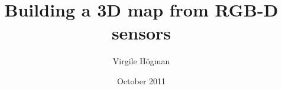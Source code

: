 \documentclass[a4paper,11pt]{kth-mag}
\title{Building a 3D map from RGB-D sensors}
\author{Virgile H\"{o}gman}
\date{October 2011}
\begin{document}
\frontmatter
\maketitle
\clearpage
{}
\begin {abstract}

\end{abstract}
%
\clearpage
\tableofcontents



\mainmatter



\clearpage
{}
\printglossaries



\cleardoublepage
\renewcommand{\bibname}{References}

%  

\end{document}
